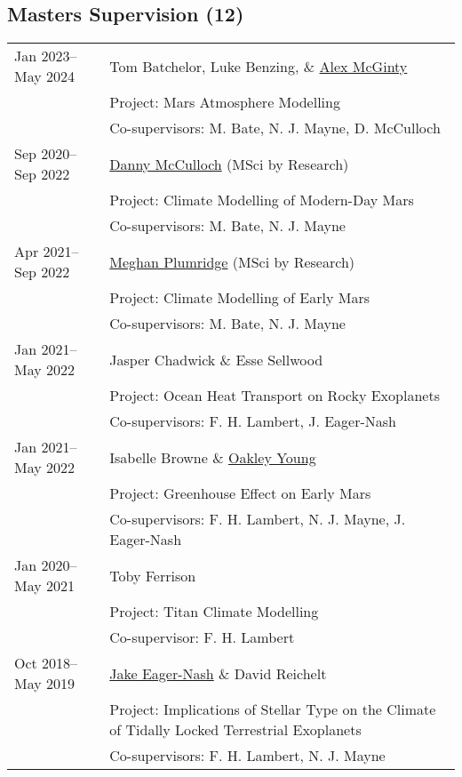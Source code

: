 \documentclass[a4paper, 11pt]{article}
\begin{document}
\subsection*{Masters Supervision (12)}
\begin{tabularx}{\linewidth}{@{}l X@{}}
Jan 2023--May 2024 & Tom Batchelor, Luke Benzing, \& \ul{Alex McGinty} \\
                   & Project: Mars Atmosphere Modelling \\
                   & Co-supervisors: M. Bate, N. J. Mayne, D. McCulloch \\
Sep 2020--Sep 2022 & \ul{Danny McCulloch} (MSci by Research) \\
                   & Project: Climate Modelling of Modern-Day Mars \\
                   & Co-supervisors: M. Bate, N. J. Mayne \\
Apr 2021--Sep 2022 & \ul{Meghan Plumridge} (MSci by Research) \\
                   & Project: Climate Modelling of Early Mars \\
                   & Co-supervisors: M. Bate, N. J. Mayne \\
Jan 2021--May 2022 & Jasper Chadwick \& Esse Sellwood \\
                   & Project: Ocean Heat Transport on Rocky Exoplanets \\
                   & Co-supervisors: F. H. Lambert, J. Eager-Nash \\
Jan 2021--May 2022 & Isabelle Browne \& \ul{Oakley Young} \\
                   & Project: Greenhouse Effect on Early Mars \\
                   & Co-supervisors: F. H. Lambert, N. J. Mayne, J. Eager-Nash \\
Jan 2020--May 2021 & Toby Ferrison \\
                   & Project: Titan Climate Modelling \\
                   & Co-supervisor: F. H. Lambert \\
Oct 2018--May 2019 & \ul{Jake Eager-Nash} \& David Reichelt \\
                   & Project: Implications of Stellar Type on the Climate of Tidally Locked Terrestrial Exoplanets \\
                   & Co-supervisors: F. H. Lambert, N. J. Mayne \\
\end{tabularx}
\vspace{-10pt}
\end{document}
